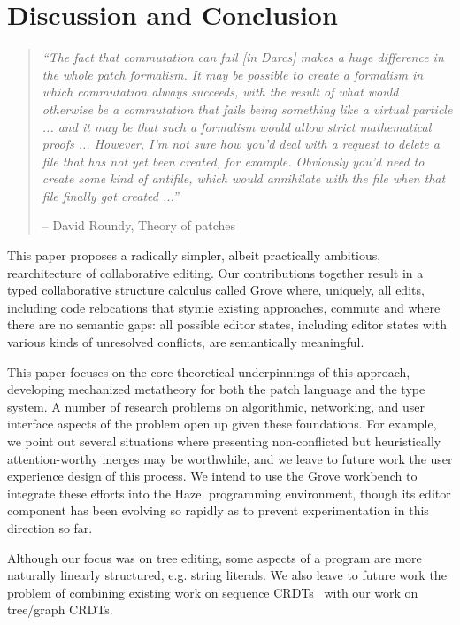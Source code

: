 
\section{Discussion and Conclusion}%
\label{sec:Discussion and Conclusion}
\begin{quote}
    \textit{``The fact that commutation can fail [in Darcs] makes a huge difference in the whole patch formalism. It may be possible to create a formalism in which commutation always succeeds, with the result of what would otherwise be a commutation that fails being something like a virtual particle ... and it may be that such a formalism would allow strict mathematical proofs ... However, I’m not sure how you’d deal with a request to delete a file that has not yet been created, for example. Obviously you’d need to create some kind of antifile, which would annihilate with the file when that file finally got created ...''} 
    
    -- David Roundy, Theory of patches~\cite{old-darcs-manual}
\end{quote}



This paper proposes a radically simpler, albeit practically ambitious, rearchitecture of collaborative editing. Our contributions together result in a typed collaborative structure calculus called Grove 
where, uniquely, all edits, including code relocations that stymie existing approaches, commute and where there are no semantic gaps: all possible editor states, including editor states with various kinds of unresolved conflicts, are semantically meaningful. 

This paper focuses on the core theoretical underpinnings of this approach,
developing mechanized metatheory for both the patch language and the type system. 
A number of research problems on algorithmic, networking, and user interface aspects of the problem open up given these foundations. For example, we point out several situations where presenting non-conflicted but heuristically attention-worthy merges may be worthwhile, and we leave to future work the user experience design of this process. We intend to use the Grove workbench to integrate these efforts into the Hazel programming environment, though its editor component has been evolving so rapidly as to prevent experimentation in this direction so far.

Although our focus was on tree editing, some aspects of a program are more naturally linearly structured, e.g. string literals. We also leave to future work the problem of combining existing work on sequence CRDTs~\cite{ahmed2011evaluating,kleppmann2020moving} with our work on tree/graph CRDTs.

